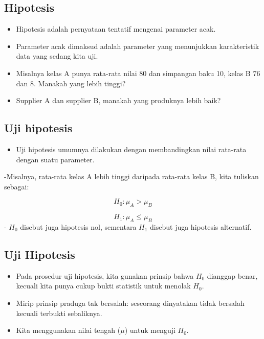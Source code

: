 \documentclass[
  letterpaper,
  DIV=11,
  numbers=noendperiod]{scrartcl}
\providecommand{\tightlist}{%
  \setlength{\itemsep}{0pt}\setlength{\parskip}{0pt}}\usepackage{longtable,booktabs,array}
\begin{document}
\hypertarget{hipotesis}{%
\subsection{Hipotesis}\label{hipotesis}}

\begin{itemize}
\item
  Hipotesis adalah pernyataan tentatif mengenai parameter acak.
\item
  Parameter acak dimaksud adalah parameter yang menunjukkan
  karakteristik data yang sedang kita uji.
\item
  Misalnya kelas A punya rata-rata nilai 80 dan simpangan baku 10, kelas
  B 76 dan 8. Manakah yang lebih tinggi?
\item
  Supplier A dan supplier B, manakah yang produknya lebih baik?
\end{itemize}

\hypertarget{uji-hipotesis-1}{%
\subsection{Uji hipotesis}\label{uji-hipotesis-1}}

\begin{itemize}
\tightlist
\item
  Uji hipotesis umumnya dilakukan dengan membandingkan nilai rata-rata
  dengan suatu parameter.
\end{itemize}

-Misalnya, rata-rata kelas A lebih tinggi daripada rata-rata kelas B,
kita tuliskan sebagai:

\[
H_0: \mu_A > \mu_B
\]

\[
H_1: \mu_A \leq \mu_B
\] - \(H_0\) disebut juga hipotesis nol, sementara \(H_1\) disebut juga
hipotesis alternatif.

\hypertarget{uji-hipotesis-2}{%
\subsection{Uji Hipotesis}\label{uji-hipotesis-2}}

\begin{itemize}
\item
  Pada prosedur uji hipotesis, kita gunakan prinsip bahwa \(H_0\)
  dianggap benar, kecuali kita punya cukup bukti statistik untuk menolak
  \(H_0\).
\item
  Mirip prinsip praduga tak bersalah: seseorang dinyatakan tidak
  bersalah kecuali terbukti sebaliknya.
\item
  Kita menggunakan nilai tengah (\(\mu\)) untuk menguji \(H_0\).
\end{itemize}
\end{document}
